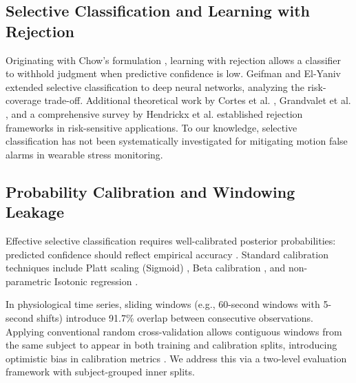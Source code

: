 \documentclass[conference]{IEEEtran}
\begin{document}
\subsection{Selective Classification and Learning with Rejection}
Originating with Chow's formulation \cite{chow1970optimum}, learning with rejection allows a classifier to withhold judgment when predictive confidence is low. Geifman and El-Yaniv \cite{geifman2017selective, geifman2019selectivenet} extended selective classification to deep neural networks, analyzing the risk-coverage trade-off. Additional theoretical work by Cortes et al. \cite{cortes2016learning}, Grandvalet et al. \cite{grandvalet2008support}, and a comprehensive survey by Hendrickx et al. \cite{hendrickx2024machine} established rejection frameworks in risk-sensitive applications. To our knowledge, selective classification has not been systematically investigated for mitigating motion false alarms in wearable stress monitoring.

\subsection{Probability Calibration and Windowing Leakage}
Effective selective classification requires well-calibrated posterior probabilities: predicted confidence should reflect empirical accuracy \cite{guo2017calibration}. Standard calibration techniques include Platt scaling (Sigmoid) \cite{platt1999probabilistic}, Beta calibration \cite{kull2017beta}, and non-parametric Isotonic regression \cite{zadrozny2002transforming, niculescu2005predicting}.

In physiological time series, sliding windows (e.g., 60-second windows with 5-second shifts) introduce 91.7\% overlap between consecutive observations. Applying conventional random cross-validation allows contiguous windows from the same subject to appear in both training and calibration splits, introducing optimistic bias in calibration metrics \cite{saeb2017need, little2017using}. We address this via a two-level evaluation framework with subject-grouped inner splits.
\end{document}
